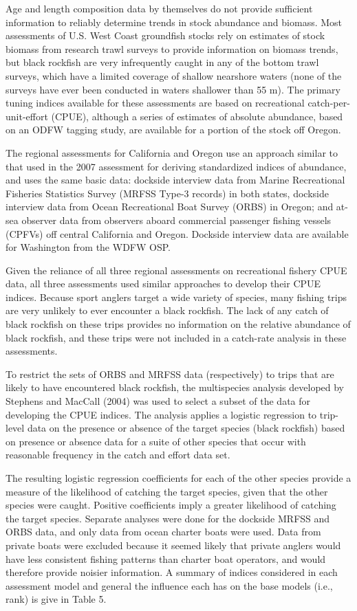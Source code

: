\documentclass[11pt,
  english,
  letterpaper,
]{article}
\begin{document}
Age and length composition data by themselves do not provide sufficient information to reliably determine trends in stock abundance and biomass. Most assessments of U.S. West Coast groundfish stocks rely on estimates of stock biomass from research trawl surveys to provide information on biomass trends, but black rockfish are very infrequently caught in any of the bottom trawl surveys, which have a limited coverage of shallow nearshore waters (none of the surveys have ever been conducted in waters shallower than 55 m). The primary tuning indices available for these assessments are based on recreational catch-per-unit-effort (CPUE), although a series of estimates of absolute abundance, based on an ODFW tagging study, are available for a portion of the stock off Oregon.

The regional assessments for California and Oregon use an approach similar to that used in the 2007 assessment for deriving standardized indices of abundance, and uses the same basic data: dockside interview data from Marine Recreational Fisheries Statistics Survey (MRFSS Type-3 records) in both states, dockside interview data from Ocean Recreational Boat Survey (ORBS) in Oregon; and at-sea observer data from observers aboard commercial passenger fishing vessels (CPFVs) off central California and Oregon. Dockside interview data are available for Washington from the WDFW OSP.

Given the reliance of all three regional assessments on recreational fishery CPUE data, all three assessments used similar approaches to develop their CPUE indices. Because sport anglers target a wide variety of species, many fishing trips are very unlikely to ever encounter a black rockfish. The lack of any catch of black rockfish on these trips provides no information on the relative abundance of black rockfish, and these trips were not included in a catch-rate analysis in these assessments.

To restrict the sets of ORBS and MRFSS data (respectively) to trips that are likely to have encountered black rockfish, the multispecies analysis developed by Stephens and MacCall (2004) was used to select a subset of the data for developing the CPUE indices. The analysis applies a logistic regression to trip-level data on the presence or absence of the target species (black rockfish) based on presence or absence data for a suite of other species that occur with reasonable frequency in the catch and effort data set.

The resulting logistic regression coefficients for each of the other species provide a measure of the likelihood of catching the target species, given that the other species were caught. Positive coefficients imply a greater likelihood of catching the target species. Separate analyses were done for the dockside MRFSS and ORBS data, and only data from ocean charter boats were used. Data from private boats were excluded because it seemed likely that private anglers would have less consistent fishing patterns than charter boat operators, and would therefore provide noisier information. A summary of indices considered in each assessment model and general the influence each has on the base models (i.e., rank) is give in Table 5.
\end{document}
